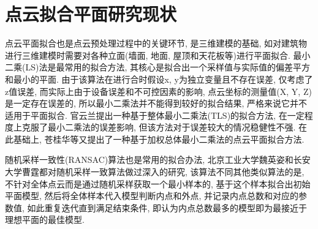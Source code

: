 \section{点云拟合平面研究现状}

点云平面拟合也是点云预处理过程中的关键环节, 是三维建模的基础, 如对建筑物进行三维建模时需要对各种立面(墙面, 地面, 屋顶和天花板等)进行平面拟合. 最小二乘(LS)法是最常用的拟合方法, 其核心是拟合出一个采样值与实际值的偏差平方和最小的平面. 由于该算法在进行合时假设x, y为独立变量且不存在误差, 仅考虑了z值误差, 而实际上由于设备误差和不可控因素的影响, 点云坐标的测量值(X, Y, Z)是一定存在误差的, 所以最小二乘法并不能得到较好的拟合结果, 严格来说它并不适用于平面拟合. 官云兰提出一种基于整体最小二乘法(TLS)的拟合方法, 在一定程度上克服了最小二乘法的误差影响, 但该方法对于误差较大的情况稳健性不强. 在此基础上, 苍桂华等又提出了一种基于加权总体最小二乘法的点云平面拟合方法.

随机采样一致性(RANSAC)算法也是常用的拟合办法, 北京工业大学魏英姿和长安大学曹霆都对随机采样一致算法做过深入的研究, 该算法不同其他类似算法的是, 不针对全体点云而是通过随机采样获取一个最小样本的, 基于这个样本拟合出初始平面模型, 然后将全体样本代入模型判断内点和外点, 并记录内点总数和对应的参数值, 如此重复迭代直到满足结束条件, 即认为内点总数最多的模型即为最接近于理想平面的最佳模型.